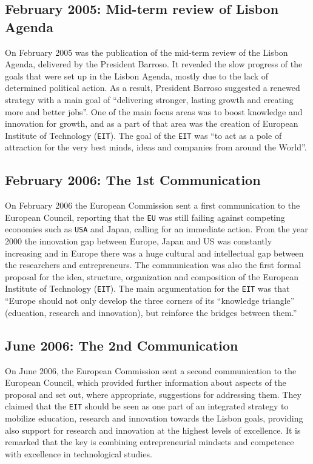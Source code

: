 \documentclass[11pt,a4paper,oneside,twocolumn]{IEEEtran}
\begin{document}
\subsection{February 2005: Mid-term review of Lisbon Agenda}
On February 2005 was the publication of the mid-term review of the Lisbon Agenda, delivered by the President Barroso.
It revealed the slow progress of the goals that were set up in the Lisbon Agenda, mostly due to the lack of determined political action\cite{3_2}.
As a result, President Barroso suggested a renewed strategy with a main goal of ``delivering stronger, lasting growth and creating more and better jobs''\cite{3_3}.
One of the main focus areas was to boost knowledge and innovation for growth, and as a part of that area was the creation of European Institute of Technology (\texttt{EIT})\cite{3_3}.
The goal of the \texttt{EIT} was ``to act as a pole of attraction for the very best minds, ideas and companies from around the World''\cite{3_3}.

\subsection{February 2006: The 1st Communication}
On February 2006 the European Commission sent a first communication to the European Council, reporting that the \texttt{EU} was still failing against competing economies such as \texttt{USA} and Japan, calling for an immediate action. From the year 2000 the innovation gap between Europe, Japan and US was constantly increasing and in Europe there was a huge cultural and intellectual gap between the researchers and entrepreneurs\cite{3_4}.
The communication was also the first formal proposal for the idea, structure, organization and composition of the European Institute of Technology (\texttt{EIT}). The main argumentation for the \texttt{EIT} was that ``Europe should not only develop the three corners of its ``knowledge triangle'' (education, research and innovation), but reinforce the bridges between them.''\cite{3_4}

\subsection{June 2006: The 2nd Communication}
On June 2006, the European Commission sent a second communication to the European Council, which provided further information about aspects of the proposal and set out, where appropriate, suggestions for addressing them. They claimed that the \texttt{EIT} should be seen as one part of an integrated strategy to mobilize education, research and innovation towards the Lisbon goals, providing also support for research and innovation at the highest levels of excellence. It is remarked that the key is combining entrepreneurial mindsets and competence with excellence in technological studies\cite{3_5}.
\end{document}
